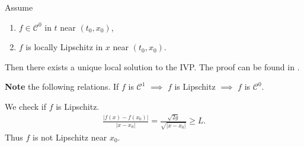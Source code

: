\begin{theorem}[Picard]
	Assume 
	\begin{enumerate}
		\item  $f \in \mathcal{C}^0$ in $t$ near $(t_0,  {x}_0)$,
		\item $f$ is locally Lipschitz in $ {x}$ near $(t_0,  {x}_0)$.
	\end{enumerate}
	Then there exists a unique local solution to the IVP. The proof can be found in \cite{Arnold}. 	
\end{theorem}
\textbf{Note} the following relations. If $f$ is $\mathcal{C}^1$ $\implies$ $f $ is Lipschitz $\implies $ $f$ is $\mathcal{C}^0$.
\begin{ex}
	We check if $f$ is Lipschitz.
	\begin{align}
		\frac{ | f(x) - f(x_0)  |}{ |x-x_0 |} = \frac{\sqrt{2g}}{\sqrt{ |x-x_0 |}} \geq  L.
	\end{align}
Thus $f$ is not Lipschitz near $x_0$.	
\end{ex}

